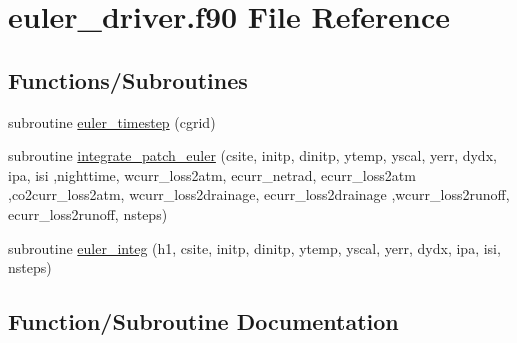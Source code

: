 \hypertarget{euler__driver_8f90}{}\section{euler\+\_\+driver.\+f90 File Reference}
\label{euler__driver_8f90}
\subsection*{Functions/\+Subroutines}
\begin{DoxyCompactItemize}
\item 
subroutine \hyperlink{euler__driver_8f90_a5219f633b6d9b0d321429096e0d3ea66}{euler\+\_\+timestep} (cgrid)
\item 
subroutine \hyperlink{euler__driver_8f90_a284012473d288e2474d9eaebf1456c2a}{integrate\+\_\+patch\+\_\+euler} (csite, initp, dinitp, ytemp, yscal, yerr, dydx, ipa, isi                                                                                                                                                               ,nighttime, wcurr\+\_\+loss2atm, ecurr\+\_\+netrad, ecurr\+\_\+loss2atm                                                                                                                                               ,co2curr\+\_\+loss2atm, wcurr\+\_\+loss2drainage, ecurr\+\_\+loss2drainage                                                                                                                               ,wcurr\+\_\+loss2runoff, ecurr\+\_\+loss2runoff, nsteps)
\item 
subroutine \hyperlink{euler__driver_8f90_a70d969f0d0abf5f83e128f4c616079e1}{euler\+\_\+integ} (h1, csite, initp, dinitp, ytemp, yscal, yerr, dydx, ipa, isi, nsteps)
\end{DoxyCompactItemize}


\subsection{Function/\+Subroutine Documentation}
